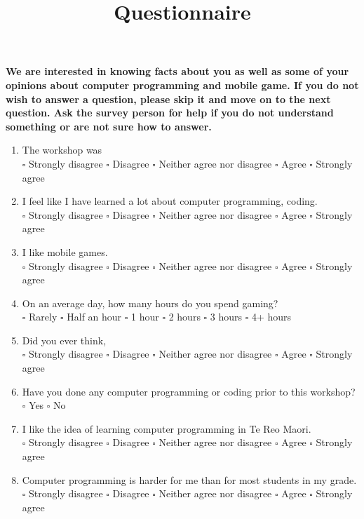 \documentclass[12pt]{article}\pagestyle{myheadings}
\title{Questionnaire}
\theoremstyle{plain}
\begin{document}
\textbf{We are interested in knowing facts about you as well as some of your opinions about
computer programming and mobile game. If you do not wish to answer a question, please skip it and move on to the next question. Ask the survey person for help if you do not understand something or are not sure how
to answer.}
\begin{enumerate}

\item The workshop was \\
$\square$ Strongly disagree $\square$ Disagree $\square$ Neither agree nor disagree $\square$ Agree $\square$ Strongly agree


\item I feel like I have learned a lot about computer programming, coding. \\
$\square$ Strongly disagree $\square$ Disagree $\square$ Neither agree nor disagree $\square$ Agree $\square$ Strongly agree



\item I like mobile games. \\
$\square$ Strongly disagree $\square$ Disagree $\square$ Neither agree nor disagree $\square$ Agree $\square$ Strongly agree

\item On an average day, how many hours do you spend gaming? \\
$\square$ Rarely $\square$ Half an hour	$\square$ 1 hour $\square$ 2 hours $\square$ 3 hours $\square$	4+ hours


\item Did you ever think,  \\
$\square$ Strongly disagree $\square$ Disagree $\square$ Neither agree nor disagree $\square$ Agree $\square$ Strongly agree


\item Have you done any computer programming or coding prior to this workshop? \\
$\square$ Yes $\square$ No

\item I like the idea of learning computer programming in Te Reo Maori.\\
$\square$ Strongly disagree $\square$ Disagree $\square$ Neither agree nor disagree $\square$ Agree $\square$ Strongly agree


\item Computer programming is harder for me than for most students in my grade.\\
$\square$ Strongly disagree $\square$ Disagree $\square$ Neither agree nor disagree $\square$ Agree $\square$ Strongly agree



\end{enumerate}
\end{document}

